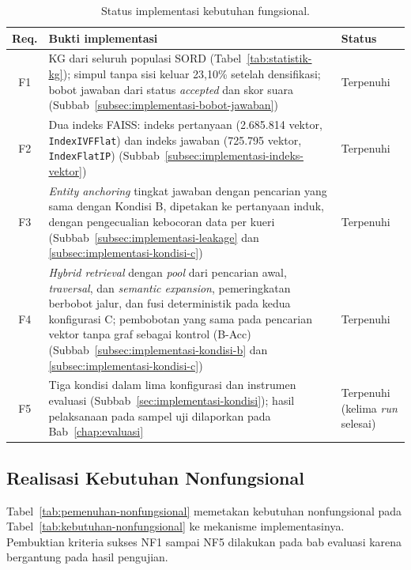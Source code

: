 \begin{table}[!htbp]
\centering
\small
\caption{Status implementasi kebutuhan fungsional.}
\label{tab:pemenuhan-fungsional}
\renewcommand{\arraystretch}{1.2}
\begin{tabularx}{\textwidth}{|c|>{\raggedright\arraybackslash}X|>{\raggedright\arraybackslash}p{2.8cm}|}
\hline
\textbf{Req.} & \textbf{Bukti implementasi} & \textbf{Status} \\
\hline
F1 & KG dari seluruh populasi SORD (Tabel~\ref{tab:statistik-kg}); simpul tanpa sisi keluar 23,10\% setelah densifikasi; bobot jawaban dari status \emph{accepted} dan skor suara (Subbab~\ref{subsec:implementasi-bobot-jawaban}) & Terpenuhi \\
\hline
F2 & Dua indeks FAISS: indeks pertanyaan (2.685.814 vektor, \texttt{IndexIVFFlat}) dan indeks jawaban (725.795 vektor, \texttt{IndexFlatIP}) (Subbab~\ref{subsec:implementasi-indeks-vektor}) & Terpenuhi \\
\hline
F3 & \emph{Entity anchoring} tingkat jawaban dengan pencarian yang sama dengan Kondisi B, dipetakan ke pertanyaan induk, dengan pengecualian kebocoran data per kueri (Subbab~\ref{subsec:implementasi-leakage} dan \ref{subsec:implementasi-kondisi-c}) & Terpenuhi \\
\hline
F4 & \emph{Hybrid retrieval} dengan \emph{pool} dari pencarian awal, \emph{traversal}, dan \emph{semantic expansion}, pemeringkatan berbobot jalur, dan fusi deterministik pada kedua konfigurasi C; pembobotan yang sama pada pencarian vektor tanpa graf sebagai kontrol (B-Acc) (Subbab~\ref{subsec:implementasi-kondisi-b} dan \ref{subsec:implementasi-kondisi-c}) & Terpenuhi \\
\hline
F5 & Tiga kondisi dalam lima konfigurasi dan instrumen evaluasi (Subbab~\ref{sec:implementasi-kondisi}); hasil pelaksanaan pada sampel uji dilaporkan pada Bab~\ref{chap:evaluasi} & Terpenuhi (kelima \emph{run} selesai) \\
\hline
\end{tabularx}
\end{table}

\subsection{Realisasi Kebutuhan Nonfungsional}
\label{subsec:realisasi-nonfungsional}

Tabel~\ref{tab:pemenuhan-nonfungsional} memetakan kebutuhan nonfungsional pada Tabel~\ref{tab:kebutuhan-nonfungsional} ke mekanisme implementasinya. Pembuktian kriteria sukses NF1 sampai NF5 dilakukan pada bab evaluasi karena bergantung pada hasil pengujian.

